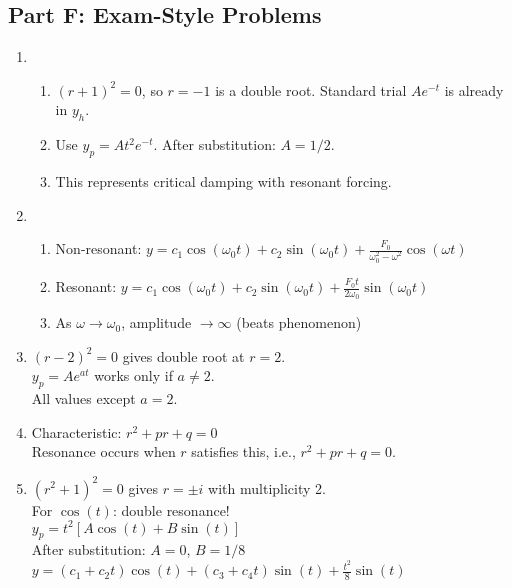 \documentclass[12pt]{article}
\begin{document}
\subsection*{Part F: Exam-Style Problems}

\begin{enumerate}[resume]
\item
\begin{enumerate}[label=(\alph*)]
\item $(r+1)^2 = 0$, so $r = -1$ is a double root. Standard trial $Ae^{-t}$ is already in $y_h$.
\item Use $y_p = At^2e^{-t}$. After substitution: $A = 1/2$.
\item This represents critical damping with resonant forcing.
\end{enumerate}

\item
\begin{enumerate}[label=(\alph*)]
\item Non-resonant: $y = c_1\cos(\omega_0 t) + c_2\sin(\omega_0 t) + \frac{F_0}{\omega_0^2 - \omega^2}\cos(\omega t)$
\item Resonant: $y = c_1\cos(\omega_0 t) + c_2\sin(\omega_0 t) + \frac{F_0 t}{2\omega_0}\sin(\omega_0 t)$
\item As $\omega \to \omega_0$, amplitude $\to \infty$ (beats phenomenon)
\end{enumerate}

\item $(r-2)^2 = 0$ gives double root at $r = 2$.\\
$y_p = Ae^{at}$ works only if $a \neq 2$.\\
All values except $a = 2$.

\item Characteristic: $r^2 + pr + q = 0$\\
Resonance occurs when $r$ satisfies this, i.e., $r^2 + pr + q = 0$.

\item $(r^2 + 1)^2 = 0$ gives $r = \pm i$ with multiplicity 2.\\
For $\cos(t)$: double resonance!\\
$y_p = t^2[A\cos(t) + B\sin(t)]$\\
After substitution: $A = 0$, $B = 1/8$\\
$y = (c_1 + c_2t)\cos(t) + (c_3 + c_4t)\sin(t) + \frac{t^2}{8}\sin(t)$
\end{enumerate}
\end{document}
